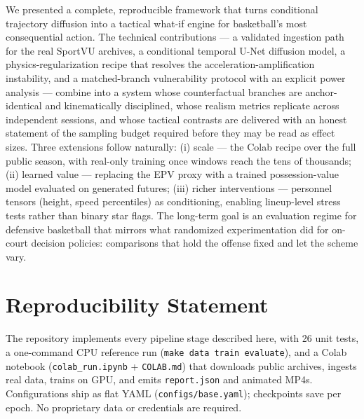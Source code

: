 \documentclass[11pt]{article}
\begin{document}
We presented a complete, reproducible framework that turns conditional
trajectory diffusion into a tactical what-if engine for basketball's most
consequential action. The technical contributions --- a validated ingestion
path for the real SportVU archives, a conditional temporal U-Net diffusion
model, a physics-regularization recipe that resolves the
acceleration-amplification instability, and a matched-branch vulnerability
protocol with an explicit power analysis --- combine into a system whose
counterfactual branches are anchor-identical and kinematically disciplined,
whose realism metrics replicate across independent sessions, and whose
tactical contrasts are delivered with an honest statement of the sampling
budget required before they may be read as effect sizes. Three
extensions follow naturally: (i) scale --- the Colab recipe over the full
public season, with real-only training once windows reach the tens of
thousands; (ii) learned value --- replacing the EPV proxy with a trained
possession-value model evaluated on generated futures; (iii) richer
interventions --- personnel tensors (height, speed percentiles) as
conditioning, enabling lineup-level stress tests rather than binary star
flags. The long-term goal is an evaluation regime for defensive basketball
that mirrors what randomized experimentation did for on-court decision
policies: comparisons that hold the offense fixed and let the scheme vary.

\section*{Reproducibility Statement}
The repository implements every pipeline stage described here, with 26 unit
tests, a one-command CPU reference run (\texttt{make data train evaluate}),
and a Colab notebook (\texttt{colab\_run.ipynb} + \texttt{COLAB.md}) that
downloads public archives, ingests real data, trains on GPU, and emits
\texttt{report.json} and animated MP4s. Configurations ship as flat YAML
(\texttt{configs/base.yaml}); checkpoints save per epoch. No proprietary
data or credentials are required.




\appendix
\end{document}
